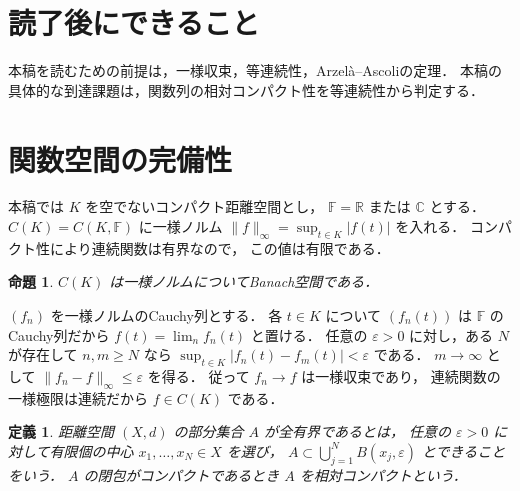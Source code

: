 \documentclass[a5paper,10pt,onecolumn]{jsarticle}
\makeatletter
\theoremstyle{mathnotetheorem}
\newtheorem{definition}[theorem]{定義}
\newtheorem{proposition}[theorem]{命題}
\renewcommand{\proofname}{証明}
\renewenvironment{proof}[1][\proofname]{%
  \par\pushQED{\qed}\normalfont\topsep4\p@\@plus2\p@\relax
  \trivlist\item[\hskip\labelsep\bfseries #1]\ignorespaces
}{\popQED\endtrivlist\@endpefalse}
\newcommand{\norm}[1]{\lVert #1\rVert}
\makeatother
\begin{document}
\section*{読了後にできること}
本稿を読むための前提は，一様収束，等連続性，Arzelà--Ascoliの定理．
本稿の具体的な到達課題は，関数列の相対コンパクト性を等連続性から判定する．

\section{関数空間の完備性}

本稿では $K$ を空でないコンパクト距離空間とし，
$\mathbb F=\mathbb R$ または $\mathbb C$ とする．
$C(K)=C(K,\mathbb F)$ に一様ノルム
$\norm f_\infty=\sup_{t\in K}|f(t)|$ を入れる．
コンパクト性により連続関数は有界なので，
この値は有限である．

\begin{proposition}\label{prop:complete}
$C(K)$ は一様ノルムについてBanach空間である．
\end{proposition}
\begin{proof}
$(f_n)$ を一様ノルムのCauchy列とする．
各 $t\in K$ について $(f_n(t))$ は $\mathbb F$ の
Cauchy列だから $f(t)=\lim_nf_n(t)$ と置ける．
任意の $\varepsilon>0$ に対し，ある $N$ が存在して
$n,m\ge N$ なら
$\sup_{t\in K}|f_n(t)-f_m(t)|<\varepsilon$ である．
$m\to\infty$ として
$\norm{f_n-f}_\infty\le\varepsilon$ を得る．
従って $f_n\to f$ は一様収束であり，
連続関数の一様極限は連続だから $f\in C(K)$ である．
\end{proof}

\begin{definition}
距離空間 $(X,d)$ の部分集合 $A$ が\emph{全有界}であるとは，
任意の $\varepsilon>0$ に対して有限個の中心
$x_1,\dots,x_N\in X$ を選び，
$A\subset\bigcup_{j=1}^NB(x_j,\varepsilon)$
とできることをいう．
$A$ の閉包がコンパクトであるとき
$A$ を\emph{相対コンパクト}という．
\end{definition}
\end{document}
